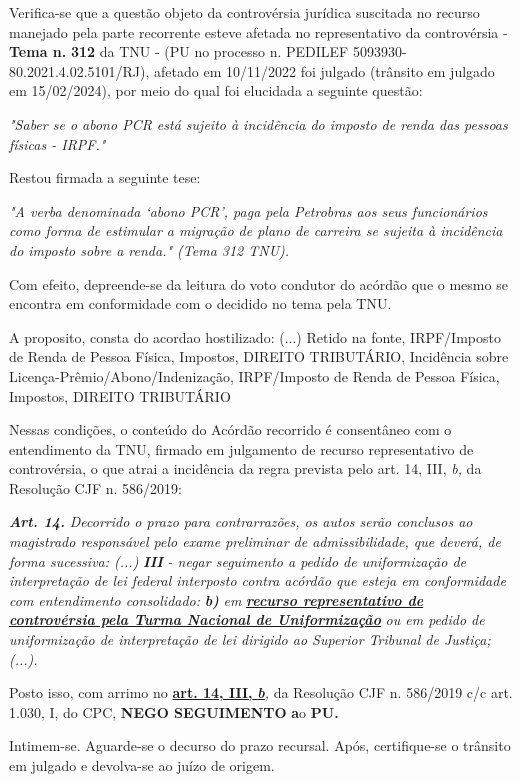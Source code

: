 \documentclass[12pt]{article}
\begin{document}
\justifying
\noindent Verifica-se que a questão objeto da controvérsia jurídica suscitada no recurso manejado pela parte recorrente esteve afetada no representativo da controvérsia - \textbf{Tema n. }\textbf{312} da TNU - (PU no processo n. PEDILEF 5093930-80.2021.4.02.5101/RJ),  afetado em 10/11/2022 foi julgado (trânsito em julgado em 15/02/2024), por meio do qual foi elucidada a seguinte questão:

\noindent \textit{"Saber se o abono PCR está sujeito à incidência do imposto de renda das pessoas físicas - IRPF."}

\noindent Restou firmada a seguinte tese:

\noindent \textit{"A verba denominada ‘abono PCR’, paga pela Petrobras aos seus funcionários como forma de estimular a migração de plano de carreira se sujeita à incidência do imposto sobre a renda." (Tema 312 TNU).}

\noindent Com efeito, depreende-se da leitura do voto condutor do acórdão que o mesmo se encontra em conformidade com o decidido no  tema pela TNU.

\noindent A proposito, consta do acordao hostilizado: (...) Retido na fonte, IRPF/Imposto de Renda de Pessoa Física, Impostos, DIREITO TRIBUTÁRIO, Incidência sobre Licença-Prêmio/Abono/Indenização, IRPF/Imposto de Renda de Pessoa Física, Impostos, DIREITO TRIBUTÁRIO

\noindent Nessas condições, o conteúdo do Acórdão recorrido é consentâneo com o entendimento da TNU, firmado em julgamento de recurso representativo de controvérsia, o que atrai a incidência da regra prevista pelo art. 14, III, \textit{b,} da Resolução CJF n. 586/2019:

\noindent \textit{\textbf{Art. 14.}}\textit{ Decorrido o prazo para contrarrazões, os autos serão conclusos ao magistrado responsável pelo exame preliminar de admissibilidade, que deverá, de forma sucessiva: (...) }\textit{\textbf{III }}\textit{- negar seguimento a pedido de uniformização de interpretação de lei federal interposto contra acórdão que esteja em conformidade com entendimento consolidado: }\textit{\textbf{b)}}\textit{ em }\uline{\textit{\textbf{recurso representativo de controvérsia pela Turma Nacional de Uniformização}}}\textit{ ou em pedido de uniformização de interpretação de lei dirigido ao Superior Tribunal de Justiça;(...).}

\noindent Posto isso, com arrimo no \uline{\textbf{art. 14, III, }}\uline{\textit{\textbf{b}}}\textit{,} da Resolução CJF n. 586/2019 c/c art. 1.030, I, do CPC, \textbf{NEGO SEGUIMENTO }\textbf{a}o\textbf{ PU}\textbf{.}

\noindent Intimem-se. Aguarde-se o decurso do prazo recursal. Após, certifique-se o trânsito em julgado e devolva-se ao juízo de origem.
\end{document}
